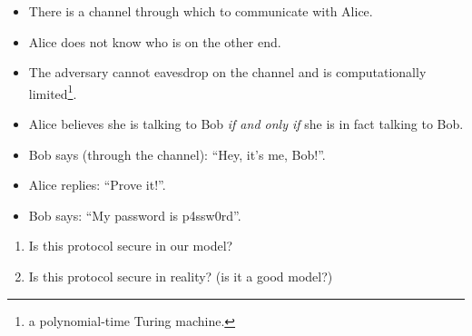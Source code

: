 \begin{frame}
  \begin{example}
    \begin{itemize}
      \item There is a channel through which to communicate with Alice.
      \item Alice does not know who is on the other end.
      \item The adversary cannot eavesdrop on the channel and is 
        computationally limited\footnote{\Ie a polynomial-time Turing 
          machine.}.
    \end{itemize}
  \end{example}

  \begin{example}
    \begin{itemize}
      \item Alice believes she is talking to Bob \emph{if and only if} she is 
        in fact talking to Bob.
    \end{itemize}
  \end{example}
\end{frame}

\begin{frame}
  \begin{example}
    \begin{itemize}
      \item Bob says (through the channel): \enquote{Hey, it's me, Bob!}.
      \item Alice replies: \enquote{Prove it!}.
      \item Bob says: \enquote{My password is p4ssw0rd}.
    \end{itemize}
  \end{example}

  \pause

  \begin{question}
    \begin{enumerate}
      \item Is this protocol secure in our model?
      \item Is this protocol secure in reality? (\Ie is it a good model?)
    \end{enumerate}
  \end{question}
\end{frame}

